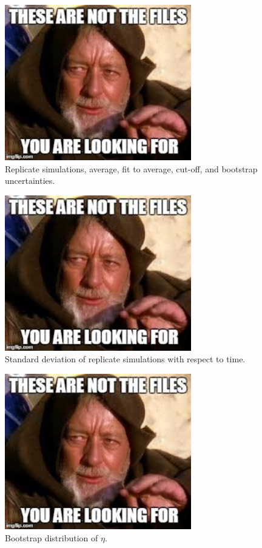 \documentclass[preprint,review,12pt]{elsarticle}
\begin{document}
	\begin{figure}[htb!]
		\centering
		\includegraphics[width=3.2in]{empty_figure.jpg}
		\caption{Replicate simulations, average, fit to average, cut-off, and bootstrap uncertainties.}
		\label{fig:replicates}
	\end{figure} 

	\begin{figure}[htb!]
		\centering
		\includegraphics[width=3.2in]{empty_figure.jpg}
		\caption{Standard deviation of replicate simulations with respect to time.}
		\label{fig:standard_deviation}
	\end{figure} 

	\begin{figure}[htb!]
		\centering
		\includegraphics[width=3.2in]{empty_figure.jpg}
		\caption{Bootstrap distribution of $\eta$.}
		\label{fig:bootstraps}
	\end{figure} 
\end{document}
